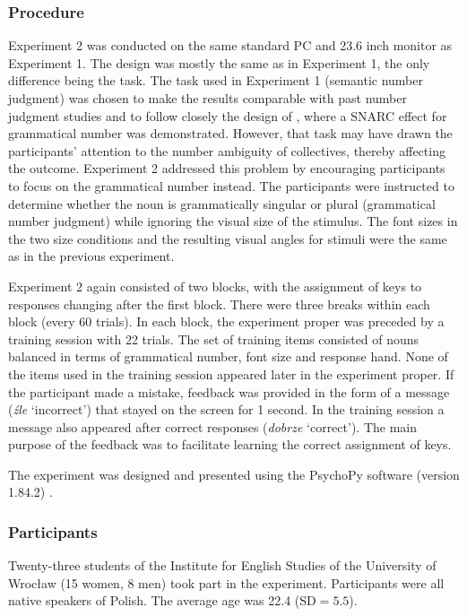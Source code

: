 \documentclass[output=paper]{langscibook}
\begin{document}
\subsubsection{Procedure}
Experiment 2 was conducted on the same standard PC and 23.6 inch monitor as Experiment 1.
The design was mostly the same as in Experiment 1, the only difference being the task. The task used in Experiment 1 (semantic number judgment) was chosen to make the results comparable with past number judgment studies \citep{bockMeaningSoundSyntax1993, nenonenMismatchesGrammaticalNumber2010} and to follow closely the design of \citet{rottgerGrammaticalNumberElicits2015}, where a SNARC effect for grammatical number was demonstrated. However, that task may have drawn the participants’ attention to the number ambiguity of collectives, thereby affecting the outcome. Experiment 2 addressed this problem by encouraging participants to focus on the grammatical number instead. The participants were instructed to determine whether the noun is grammatically singular or plural (grammatical number judgment) while ignoring the visual size of the stimulus. The font sizes in the two size conditions and the resulting visual angles for stimuli were the same as in the previous experiment.

Experiment 2 again consisted of two blocks, with the assignment of keys to responses changing after the first block. There were three breaks within each block (every 60 trials). In each block, the experiment proper was preceded by a training session with 22 trials. The set of training items consisted of nouns balanced in terms of grammatical number, font size and response hand. None of the items used in the training session appeared later in the experiment proper. If the participant made a mistake, feedback was provided  in the form of a message (\textit{źle} `incorrect') that stayed on the screen for 1 second. In the training session a message also appeared after correct responses (\textit{dobrze} `correct'). The main purpose of the feedback was to facilitate learning the correct assignment of keys.

The experiment was designed and presented using the PsychoPy software (version 1.84.2) \citep{peircePsychoPyPsychophysicsSoftware2007,peirceGeneratingStimuliNeuroscience2009}.

\subsubsection{Participants}
Twenty-three students of the Institute for English Studies of the University of Wrocław (15 women, 8 men) took part in the experiment. Participants were all native speakers of Polish. The average age was 22.4 ($\text{SD}=5.5$).
\end{document}
